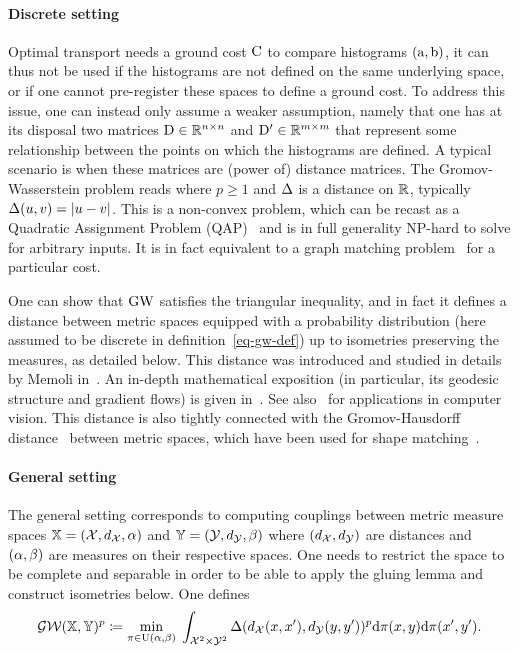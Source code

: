 \paragraph{Discrete setting} 


Optimal transport needs a ground cost $\mathrm{C}$ to compare histograms $(\mathrm{a},\mathrm{b})$, it can thus not be used if the histograms are not defined on the same underlying space, or if one cannot pre-register these spaces to define a ground cost. 
%
To address this issue, one can instead only assume a weaker assumption, namely that one has at its disposal two matrices $\mathrm{D} \in \mathbb{R}^{n \times n}$ and $\mathrm{D}' \in \mathbb{R}^{m \times m}$ that represent some relationship between the points on which the histograms are defined. A typical scenario is when these matrices are (power of) distance matrices.
%
The Gromov-Wasserstein problem reads
where $p \geq 1$ and $\Delta$ is a distance on $\mathbb{R}$, typically $\Delta(u,v)=|u-v|$.
%
This is a non-convex problem, which can be recast as a Quadratic Assignment Problem (QAP)~\cite{loiola-2007} and is in full generality NP-hard to solve for arbitrary inputs. 
%
It is in fact equivalent to a graph matching problem~\cite{lyzinski-2015} for a particular cost.

One can show that $\operatorname{\mathrm{GW}}$ satisfies the triangular inequality, and in fact it defines a distance between metric spaces equipped with a probability distribution (here assumed to be discrete in definition~\eqref{eq-gw-def}) up to isometries preserving the measures, as detailed below.
%
This distance was introduced and studied in details by Memoli in~\cite{memoli-2011}. An in-depth mathematical exposition (in particular, its geodesic structure and gradient flows) is given in~\cite{SturmGW}. See also~\cite{schmitzer2013modelling} for applications in computer vision.
%
This distance is also tightly connected with the Gromov-Hausdorff distance~\cite{gromov-2001} between metric spaces, which have been used for shape matching~\cite{memoli-2007,bronstein-2010}. 


\paragraph{General setting} 

The general setting corresponds to computing couplings between metric measure spaces $\mathbb{X}=(\mathcal{X},d_{\mathcal{X}},\alpha)$
	and $\mathbb{Y}=(\mathcal{Y},d_{\mathcal{Y}},\beta)$ where $(d_{\mathcal{X}},d_{\mathcal{Y}})$ are distances and $(\alpha,\beta)$ are measures on their respective spaces.
	One needs to restrict the space to be complete and separable in order to be able to apply the gluing lemma and construct isometries below.
	One defines 
	\begin{align}
		\label{eq-gw-generic}
		\operatorname{\mathcal{GW}}( \mathbb{X},\mathbb{Y} )^p \coloneqq 
		\underset{ \pi \in \mathrm{U}(\alpha,\beta) }{\min}\; 
		\int_{\mathcal{X}^2 \times \mathcal{Y}^2}
		 \Delta(d_{\mathcal{X}}(x,x'),d_{\mathcal{Y}}(y,y'))^p
		\mathrm{d}\pi(x,y)\mathrm{d}\pi(x',y').
	\end{align}
 
